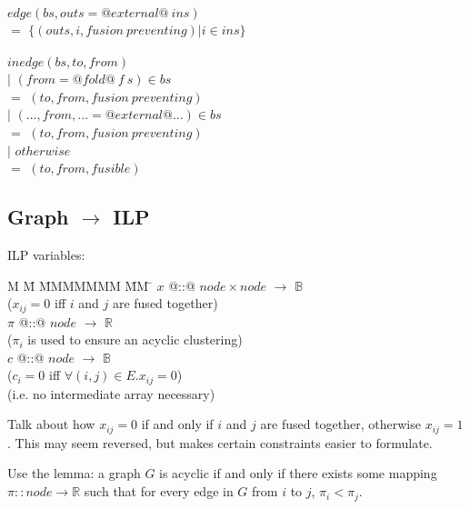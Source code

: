 \begin{tabbing}
$edge(bs, outs = @external@~ins)$  \\
                              \> $=$    \> $\{(outs,i, fusion~preventing) | i \in ins \}$ \\
\\
$inedge(bs,to,from)$ \\
                     \> $|$ \> $(from = @fold@~f~s) \in bs$     \\
                     \> $=$ \> $(to, from, fusion~preventing)$  \\
                     \> $|$ \> $(\ldots,from,\ldots = @external@ \ldots) \in bs$     \\
                     \> $=$ \> $(to, from, fusion~preventing)$  \\
                     \> $|$ \> $otherwise$                      \\
                     \> $=$ \> $(to, from, fusible)$            \\
\end{tabbing}

\subsection{Graph $\to$ ILP}

ILP variables:
\begin{tabbing}
M   \= M \= MMMMMMM \= MM \= \kill
$x$   \> @::@  \> $node \times node$ \> $\to$ \> $\mathbb{B}$ \\
      \>       \> ($x_{ij} = 0$ iff $i$ and $j$ are fused together) \\
$\pi$ \> @::@  \> $node$             \> $\to$ \> $\mathbb{R}$ \\
      \>       \> ($\pi_i$ is used to ensure an acyclic clustering) \\
$c$   \> @::@  \> $node$             \> $\to$ \> $\mathbb{B}$ \\
      \>       \> ($c_i = 0$ iff $\forall (i,j) \in E. x_{ij} = 0$) \\
      \>       \> (i.e. no intermediate array necessary)            \\
\end{tabbing}

Talk about how $x_{ij} = 0$ if and only if $i$ and $j$ are fused together, otherwise $x_{ij} = 1$. This may seem reversed, but makes certain constraints easier to formulate.

Use the lemma:
a graph $G$ is acyclic if and only if there exists some mapping $\pi :: node \to \mathbb{R}$ such that for every edge in $G$ from $i$ to $j$, $\pi_i < \pi_j$.



